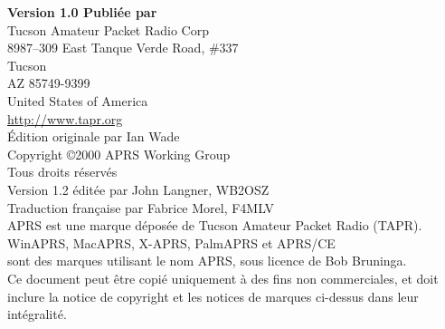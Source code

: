\vspace{2em}
\noindent
{\sffamily\bfseries Version 1.0 Publiée par}\\[\baselineskip]
Tucson Amateur Packet Radio Corp\\
8987--309 East Tanque Verde Road, \#337\\
Tucson\\
AZ 85749-9399\\
United States of America\\[\baselineskip]
\url{http://www.tapr.org}\\[1.5\baselineskip]
Édition originale par Ian Wade\\[\baselineskip]
Copyright \copyright{}2000 APRS Working Group\\
Tous droits réservés\\[\baselineskip]
Version 1.2 éditée par John Langner, WB2OSZ\\
Traduction française par Fabrice Morel, F4MLV\\[1.5\baselineskip]
APRS\textregistered{} est une marque déposée de
Tucson Amateur Packet Radio (TAPR).\\
WinAPRS\texttrademark{}, MacAPRS\texttrademark{}, X-APRS\texttrademark{},
PalmAPRS\texttrademark{} et APRS/CE\texttrademark{}\\
sont des marques utilisant le nom APRS\textregistered{}, sous licence
de Bob Bruninga.\\[\baselineskip]
Ce document peut être copié uniquement à des fins non commerciales, et doit\\
inclure la notice de copyright et les notices de marques ci-dessus dans leur
intégralité.\par
\endgroup

